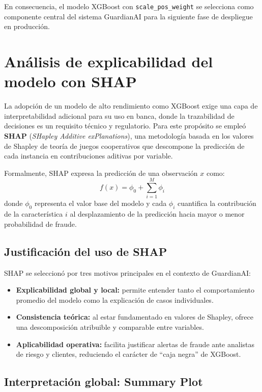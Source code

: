 \documentclass[12pt,a4paper]{report}
\begin{document}
En consecuencia, el modelo XGBoost con \texttt{scale\_pos\_weight} se selecciona como componente central del sistema GuardianAI para la siguiente fase de despliegue en producción.

\section{Análisis de explicabilidad del modelo con SHAP}
\label{sec:h3_shap}

La adopción de un modelo de alto rendimiento como XGBoost exige una capa de interpretabilidad adicional para su uso en banca, donde la trazabilidad de decisiones es un requisito técnico y regulatorio. Para este propósito se empleó \textbf{SHAP} (\textit{SHapley Additive exPlanations}), una metodología basada en los valores de Shapley de teoría de juegos cooperativos que descompone la predicción de cada instancia en contribuciones aditivas por variable.

Formalmente, SHAP expresa la predicción de una observación $x$ como:
\begin{equation*}
f(x) = \phi_0 + \sum_{i=1}^{M} \phi_i
\end{equation*}
donde $\phi_0$ representa el valor base del modelo y cada $\phi_i$ cuantifica la contribución de la característica $i$ al desplazamiento de la predicción hacia mayor o menor probabilidad de fraude.

\subsection{Justificación del uso de SHAP}

SHAP se seleccionó por tres motivos principales en el contexto de GuardianAI:
\begin{itemize}
    \item \textbf{Explicabilidad global y local:} permite entender tanto el comportamiento promedio del modelo como la explicación de casos individuales.
    \item \textbf{Consistencia teórica:} al estar fundamentado en valores de Shapley, ofrece una descomposición atribuible y comparable entre variables.
    \item \textbf{Aplicabilidad operativa:} facilita justificar alertas de fraude ante analistas de riesgo y clientes, reduciendo el carácter de ``caja negra'' de XGBoost.
\end{itemize}

\subsection{Interpretación global: Summary Plot}
\end{document}
